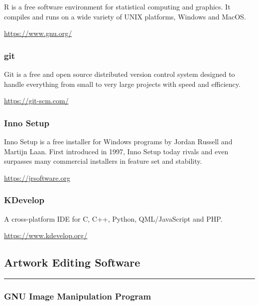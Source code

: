 \documentclass[
]{book}
\theoremstyle{definition}
\theoremstyle{definition}
\theoremstyle{definition}
\theoremstyle{definition}
\theoremstyle{remark}
\begin{document}
R is a free software environment for statistical computing and graphics. It compiles and runs on a wide variety of UNIX platforms, Windows and MacOS.

\url{https://www.gnu.org/}

\hypertarget{git}{%
\subsubsection*{git}\label{git}}

Git is a free and open source distributed version control system designed to handle everything from small to very large projects with speed and efficiency.

\url{https://git-scm.com/}

\hypertarget{inno-setup}{%
\subsubsection*{Inno Setup}\label{inno-setup}}

Inno Setup is a free installer for Windows programs by Jordan Russell and Martijn Laan. First introduced in 1997, Inno Setup today rivals and even surpasses many commercial installers in feature set and stability.

\url{https://jrsoftware.org}

\hypertarget{kdevelop}{%
\subsubsection*{KDevelop}\label{kdevelop}}

A cross-platform IDE for C, C++, Python, QML/JavaScript and PHP.

\url{https://www.kdevelop.org/}

\hypertarget{artwork-editing-software}{%
\subsection*{Artwork Editing Software}\label{artwork-editing-software}}

\begin{center}\rule{0.5\linewidth}{0.5pt}\end{center}

\hypertarget{gnu-image-manipulation-program}{%
\subsubsection*{GNU Image Manipulation Program}\label{gnu-image-manipulation-program}}
\end{document}
